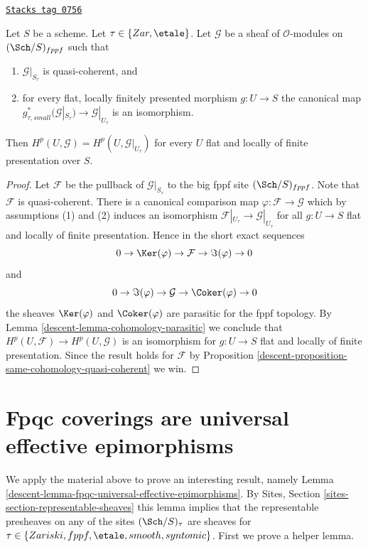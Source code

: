 \begin{lemma}
\label{descent-lemma-quasi-coherent-and-flat-base-change}
\href{https://stacks.math.columbia.edu/tag/0756}{\texttt{Stacks tag 0756}}

Let $S$ be a scheme. Let $\tau \in \{Zar, \etale\}$.
Let $\mathcal{G}$ be a sheaf of $\mathcal{O}$-modules on
$(\Sch/S)_{fppf}$ such that
\begin{enumerate}
\item $\mathcal{G}|_{S_\tau}$ is quasi-coherent, and
\item for every flat, locally finitely presented morphism
$g : U \to S$ the canonical map
$g_{\tau, small}^*(\mathcal{G}|_{S_\tau}) \to \mathcal{G}|_{U_\tau}$
is an isomorphism.
\end{enumerate}
Then $H^p(U, \mathcal{G}) = H^p(U, \mathcal{G}|_{U_\tau})$
for every $U$ flat and locally of finite presentation over $S$.
\end{lemma}

\begin{proof}

Let $\mathcal{F}$ be the pullback of $\mathcal{G}|_{S_\tau}$
to the big fppf site $(\Sch/S)_{fppf}$. Note that $\mathcal{F}$
is quasi-coherent. There is a canonical
comparison map $\varphi : \mathcal{F} \to \mathcal{G}$ which by
assumptions (1) and (2) induces an isomorphism
$\mathcal{F}|_{U_\tau} \to \mathcal{G}|_{U_\tau}$
for all $g : U \to S$ flat and locally of finite presentation.
Hence in the short exact sequences
$$
0 \to \Ker(\varphi) \to \mathcal{F} \to \Im(\varphi) \to 0
$$
and
$$
0 \to \Im(\varphi) \to \mathcal{G} \to \Coker(\varphi) \to 0
$$
the sheaves $\Ker(\varphi)$ and $\Coker(\varphi)$ are
parasitic for the fppf topology. By
Lemma \ref{descent-lemma-cohomology-parasitic}
we conclude that $H^p(U, \mathcal{F}) \to H^p(U, \mathcal{G})$
is an isomorphism for $g : U \to S$ flat and locally of finite presentation.
Since the result holds for $\mathcal{F}$ by
Proposition \ref{descent-proposition-same-cohomology-quasi-coherent}
we win.
\end{proof}

\section{Fpqc coverings are universal effective epimorphisms}
\label{descent-section-fpqc-universal-effective-epimorphisms}
We apply the material above to prove an interesting result, namely
Lemma \ref{descent-lemma-fpqc-universal-effective-epimorphisms}.
By Sites, Section \ref{sites-section-representable-sheaves}
this lemma implies that the representable
presheaves on any of the sites $(\Sch/S)_\tau$ are sheaves for
$\tau \in \{Zariski, fppf, \etale, smooth, syntomic\}$. First
we prove a helper lemma.

